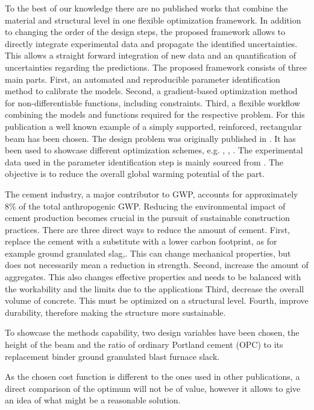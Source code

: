 To the best of our knowledge there are no published works that combine the material and structural level in one flexible optimization framework.
In addition to changing the order of the design steps, the proposed framework allows to directly integrate experimental data and propagate the identified uncertainties.
This allows a straight forward integration of new data and an quantification of uncertainties regarding the predictions.
The proposed framework consists of three main parts.
First, an automated and reproducible parameter identification method to calibrate the models.
Second, a gradient-based optimization method for non-differentiable functions, including constraints.
Third, a flexible workflow combining the models and functions required for the respective problem. 
For this publication a well known example of a simply supported, reinforced, rectangular beam  has been chosen.
The design problem was originally published in \cite{everard1966reinforced}.
It has been used to showcase different optimization schemes, e.g. \cite{Chakrabarty_1992}, \cite{Coello_1997}, \cite{Pierott_2021}.
The experimental data used in the parameter identification step is mainly sourced from \cite{gruyaert2011}.
The objective is to reduce the overall global warming potential of the part.


The cement industry, a major contributor to GWP, accounts for approximately 8\% of the total anthropogenic GWP. 
Reducing the environmental impact of cement production becomes crucial in the pursuit of sustainable construction practices.
There are three direct ways to reduce the amount of cement.
First, replace the cement with a substitute with a lower carbon footprint, as for example ground granulated slag,.
This can change mechanical properties, but does not necessarily mean a reduction in strength.
Second, increase the amount of aggregates.
This also changes effective properties and needs to be balanced with the workability and the limits due to the applications
Third, decrease the overall volume of concrete.
This must be optimized on a structural level.
Fourth, improve durability, therefore making the structure more sustainable.


To showcase the methods capability, two design variables have been chosen, the height of the beam and the ratio of ordinary Portland cement (OPC) to its replacement binder ground granulated blast furnace slack.



As the chosen cost function is different to the ones used in other publications, a direct comparison of the optimum will not be of value, however it allows to give an idea of what might be a reasonable solution.


